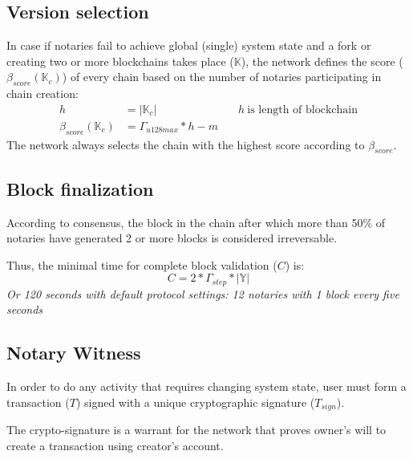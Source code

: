 \documentclass[12pt]{report}
\newcommand{\hlc}[1]{\colorbox{yellow!25}{#1}}
\begin{document}
\subsection{Version selection}
\label{tech-blockchain-score}
In case if notaries fail to achieve global (single) system state and a fork or creating two or more blockchains takes place ($\mathbb{K}$), the network defines the score ($\beta_{score}(\mathbb{K}_c)$) of every  chain based on the number of notaries participating in \hlc{chain creation}:	
\begin{align}
h &= |\mathbb{K}_c| & \quad h \ \text{is length of blockchain} \\
\beta_{score}(\mathbb{K}_c) &= \Gamma_{u128max} * h - m
\end{align}
The network always selects the chain with the highest score according to $\beta_{score}$.
\subsection{Block finalization}
\label{tech-blockchain-fin}
According to consensus, the block in the chain after which more than 50\% of notaries have generated 2 or more blocks is considered irreversable.

Thus, the minimal time for complete block validation ($C$) is:
\begin{equation}
C = 2 * \Gamma_{step} * |\mathbb{Y}|
\end{equation}
\textit{Or 120 seconds with default protocol settings: 12 notaries with 1 block every five seconds}
\subsection{Notary Witness}
\label{tech-blockchain-confirmation}
In order to do any activity that requires changing system state, user must form a transaction ($T$) signed with a unique cryptographic signature ($T_{sign}$). 

The crypto-signature is a warrant for the network that proves owner's will to create a transaction using creator's account. 
\end{document}
